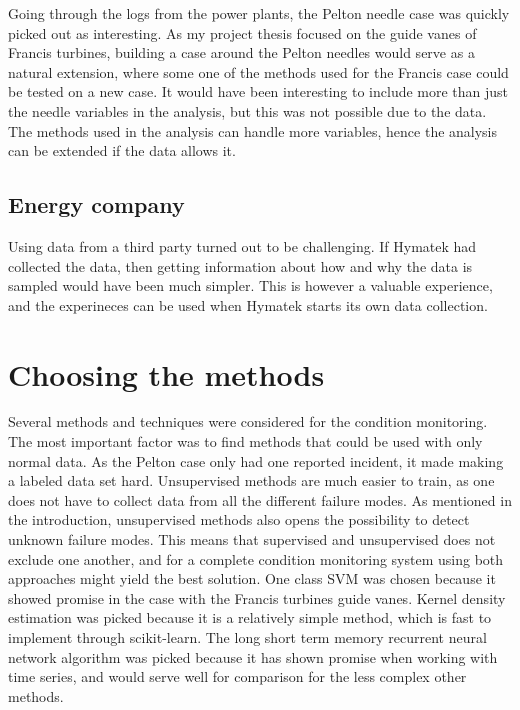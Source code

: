      Going through the logs from the power plants, the Pelton needle case was quickly picked out as interesting. As my project thesis focused on the guide vanes of Francis turbines, building a case around the Pelton needles would serve as a natural extension, where some one of the methods used for the Francis case could be tested on a new case. It would have been interesting to include more than just the needle variables in the analysis, but this was not possible due to the data. The methods used in the analysis can handle more variables, hence the analysis can be extended if the data allows it.     
    
    \subsection{Energy company}
        Using data from a third party turned out to be challenging. If Hymatek had collected the data, then getting information about how and why the data is sampled would have been much simpler. This is however a valuable experience, and the experineces can be used when Hymatek starts its own data collection. 

    

\section{Choosing the methods}
    Several methods and techniques were considered for the condition monitoring. The most important factor was to find methods that could be used with only normal data. As the Pelton case only had one reported incident, it made making a labeled data set hard. Unsupervised methods are much easier to train, as one does not have to collect data from all the different failure modes. As mentioned in the introduction, unsupervised methods also opens the possibility to detect unknown failure modes. This means that supervised and unsupervised does not exclude one another, and for a complete condition monitoring system using both approaches might yield the best solution. One class SVM was chosen because it  showed promise in the case with the Francis turbines guide vanes. Kernel density estimation was picked because it is a relatively simple method, which is fast to implement through scikit-learn. The long short term memory recurrent neural network algorithm was picked because it has shown promise when working with time series, and would serve well for comparison for the less complex other methods.  
    
